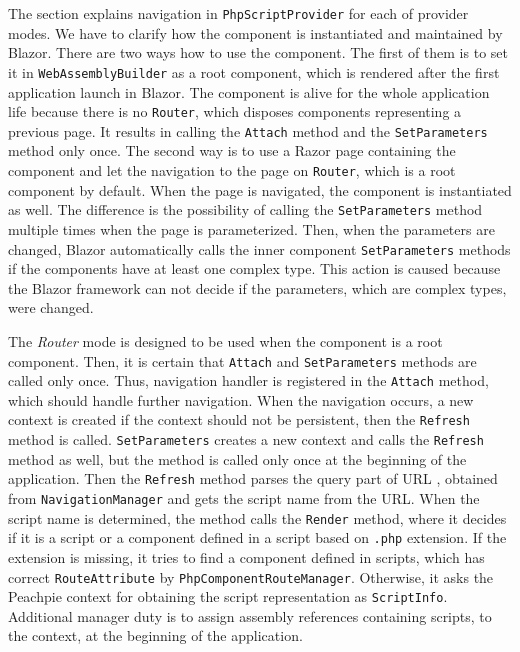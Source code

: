 The section explains navigation in \texttt{PhpScriptProvider} for each of provider modes.
We have to clarify how the component is instantiated and maintained by Blazor.
There are two ways how to use the component.
The first of them is to set it in \texttt{WebAssemblyBuilder} as a root component,
which is rendered after the first application launch in Blazor.
The component is alive for the whole application life because there is no \texttt{Router}, which disposes components representing a previous page. 
It results in calling the \texttt{Attach} method and the \texttt{SetParameters} method only once.
The second way is to use a Razor page containing the component and let the navigation to the page on \texttt{Router}, which is a root component by default.
When the page is navigated, the component is instantiated as well.
The difference is the possibility of calling the \texttt{SetParameters} method multiple times when the page is parameterized.
Then, when the parameters are changed, Blazor automatically calls the inner component \texttt{SetParameters} methods if the components have at least one complex type. 
This action is caused because the Blazor framework can not decide if the parameters, which are complex types, were changed.
\par
The \textit{Router} mode is designed to be used when the component is a root component.
Then, it is certain that \texttt{Attach} and \texttt{SetParameters} methods are called only once.
Thus, navigation handler is registered in the \texttt{Attach} method, which should handle further navigation.
When the navigation occurs, a new context is created if the context should not be persistent, then the \texttt{Refresh} method is called.
\texttt{SetParameters} creates a new context and calls the \texttt{Refresh} method as well, but the method is called only once at the beginning of the application.
Then the \texttt{Refresh} method parses the query part of URL \cite{online:querryStrings}, obtained from \texttt{NavigationManager} and gets the script name from the URL.
When the script name is determined, the method calls the \texttt{Render} method, where it decides if it is a script or a component defined in a script based on \texttt{.php} extension.
If the extension is missing, it tries to find a component defined in scripts, which has correct \texttt{RouteAttribute} by \texttt{PhpComponentRouteManager}.
Otherwise, it asks the Peachpie context for obtaining the script representation as \texttt{ScriptInfo}.
Additional manager duty is to assign assembly references containing scripts, to the context, at the beginning of the application.
